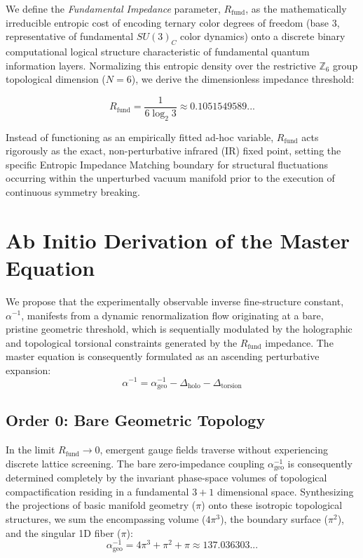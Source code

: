 \documentclass[12pt,a4paper]{article}
\begin{document}
We define the \textit{Fundamental Impedance} parameter, $R_{\text{fund}}$, as the mathematically irreducible entropic cost of encoding ternary color degrees of freedom (base 3, representative of fundamental $SU(3)_C$ color dynamics) onto a discrete binary computational logical structure characteristic of fundamental quantum information layers. Normalizing this entropic density over the restrictive $\mathbb{Z}_6$ group topological dimension ($N=6$), we derive the dimensionless impedance threshold:

\begin{equation}
R_{\text{fund}} = \frac{1}{6 \log_2 3} \approx 0.1051549589...
\label{eq:rfund}
\end{equation}

Instead of functioning as an empirically fitted ad-hoc variable, $R_{\text{fund}}$ acts rigorously as the exact, non-perturbative infrared (IR) fixed point, setting the specific Entropic Impedance Matching boundary for structural fluctuations occurring within the unperturbed vacuum manifold prior to the execution of continuous symmetry breaking.



\section{Ab Initio Derivation of the Master Equation}

We propose that the experimentally observable inverse fine-structure constant, $\alpha^{-1}$, manifests from a dynamic renormalization flow originating at a bare, pristine geometric threshold, which is sequentially modulated by the holographic and topological torsional constraints generated by the $R_{\text{fund}}$ impedance. The master equation is consequently formulated as an ascending perturbative expansion:
\begin{equation}
\alpha^{-1} = \alpha^{-1}_{\text{geo}} - \Delta_{\text{holo}} - \Delta_{\text{torsion}}
\end{equation}

\subsection{Order 0: Bare Geometric Topology}

In the limit $R_{\text{fund}} \to 0$, emergent gauge fields traverse without experiencing discrete lattice screening. The bare zero-impedance coupling $\alpha^{-1}_{\text{geo}}$ is consequently determined completely by the invariant phase-space volumes of topological compactification residing in a fundamental $3+1$ dimensional space. Synthesizing the projections of basic manifold geometry ($\pi$) onto these isotropic topological structures, we sum the encompassing volume ($4\pi^3$), the boundary surface ($\pi^2$), and the singular 1D fiber ($\pi$):
\begin{equation}
\alpha^{-1}_{\text{geo}} = 4\pi^3 + \pi^2 + \pi \approx 137.036303...
\end{equation}
\end{document}
